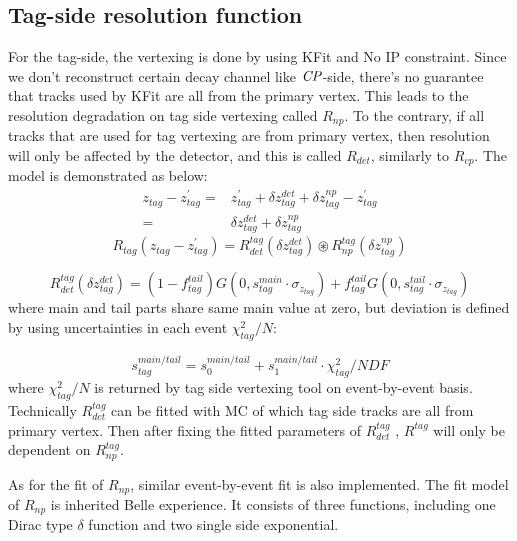 \subsection{Tag-side resolution function}

For the tag-side, the vertexing is done by using KFit and No IP constraint. Since we don't reconstruct certain decay channel like $\it{CP}$-side, there's no guarantee that tracks used by KFit are all from the primary vertex. This leads to the resolution degradation on tag side vertexing called $R_{np}$. To the contrary, if all tracks that are used for tag vertexing are from primary vertex, then resolution will only be affected by the detector, and this is called $R_{det}$, similarly to $R_{cp}$. The model is demonstrated as below:
\begin{equation}
\begin{split}
z_{tag} - z_{tag}^{'} =& z_{tag}^{'} + \delta z_{tag}^{det} + \delta z_{tag}^{np} - z_{tag}^{'}\\
=&\delta z_{tag}^{det} + \delta z_{tag}^{np}
\end{split}
\end{equation}
\begin{equation}
R_{tag}( z_{tag}- z_{tag}^{'}) = R_{det}^{tag}(\delta z_{tag}^{det}) \circledast
R_{np}^{tag}( \delta z_{tag}^{np})
\end{equation}

\begin{equation}
R_{det}^{tag}(\delta z_{tag}^{det}) = (1-f_{tag}^{tail})G(0,s_{tag}^{main}\cdot\sigma_{z_{tag}})+
f_{tag}^{tail}G(0,s_{tag}^{tail}\cdot\sigma_{z_{tag}})
\end{equation} where main and tail parts share same main value at zero, but deviation is defined by using uncertainties in each event $\chi^2_{tag}/N$: 

\begin{equation}
s_{tag}^{main/tail} = s_0^{main/tail} + s_1^{main/tail}\cdot\chi^2_{tag}/NDF
\end{equation} where $\chi^2_{tag}/N$ is returned by tag side vertexing tool on event-by-event basis.
Technically $R^{tag}_{det}$ can be fitted with MC of which tag side tracks are all from primary vertex. Then after fixing the fitted parameters of $R^{tag}_{det}$ , $R^{tag}$ will only be dependent on $R^{tag}_{np}$. 

As for the fit of $R_{np}$, similar event-by-event fit is also implemented. The fit model of $R_{np}$ is inherited Belle experience. It consists of three functions, including one Dirac type $\delta$ function and two single side exponential. 

